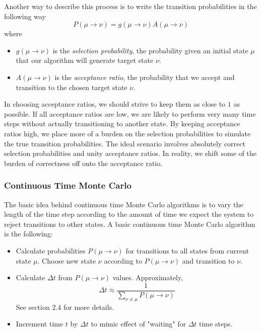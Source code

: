 \documentclass{article}
\begin{document}
Another way to describe this process is to write the transition probabilities in the following way
$$P(\mu \rightarrow \nu) = g(\mu \rightarrow \nu)A(\mu \rightarrow \nu)$$
where
\begin{itemize}
\item $g(\mu \rightarrow \nu)$ is the \emph{selection probability}, the probability given an initial state
$\mu$ that our algorithm will generate target state $\nu$.
\item $A(\mu \rightarrow \nu)$ is the \emph{acceptance ratio}, the probability that we accept and transition to
the chosen target state $\nu$.
\end{itemize}
In choosing acceptance ratios, we should strive to keep them as close to $1$ as possible. If all acceptance ratios are
low, we are likely to perform very many time steps without actually transitioning to another state. By keeping
acceptance ratios high, we place more of a burden on the selection probabilities to simulate the true transition
probabilities. The ideal scenario involves absolutely correct selection probabilities and unity acceptance ratios. In
reality, we shift some of the burden of correctness off onto the acceptance ratio.

\subsubsection{Continuous Time Monte Carlo}
The basic idea behind continuous time Monte Carlo algorithms is to vary the length of the time step according
to the amount of time we expect the system to reject transitions to other states. A basic continuous time Monte
Carlo algorithm is the following:
\begin{itemize}
\item Calculate probabilities $P(\mu \rightarrow \nu)$ for transitions to all states from
current state $\mu$. Choose new state $\nu$ according to $P(\mu \rightarrow \nu)$ and transition to
$\nu$.
\item Calculate $\Delta t$ from $P(\mu \rightarrow \nu)$ values. Approximately,
$$\Delta t \approx \frac{1}{\sum_{\nu \neq \mu} P(\mu \rightarrow \nu)}$$
See section 2.4 for more details.
\item Increment time $t$ by $\Delta t$ to mimic effect of "waiting" for $\Delta t$ time steps.
\end{itemize}
\end{document}
